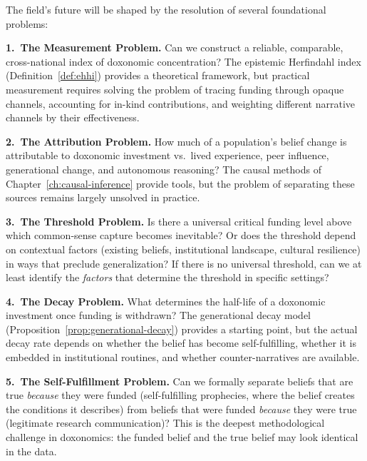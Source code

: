 The field's future will be shaped by the resolution of several foundational problems:

\begin{conjecture}
\label{conj:open}
\leavevmode

\medskip\noindent\textbf{1.\ The Measurement Problem.}
Can we construct a reliable, comparable, cross-national index of doxonomic concentration?
The epistemic Herfindahl index (Definition~\ref{def:ehhi}) provides a theoretical framework, but practical measurement requires solving the problem of tracing funding through opaque channels, accounting for in-kind contributions, and weighting different narrative channels by their effectiveness.

\medskip\noindent\textbf{2.\ The Attribution Problem.}
How much of a population's belief change is attributable to doxonomic investment vs.\ lived experience, peer influence, generational change, and autonomous reasoning?
The causal methods of Chapter~\ref{ch:causal-inference} provide tools, but the problem of separating these sources remains largely unsolved in practice.

\medskip\noindent\textbf{3.\ The Threshold Problem.}
Is there a universal critical funding level above which common-sense capture becomes inevitable?
Or does the threshold depend on contextual factors (existing beliefs, institutional landscape, cultural resilience) in ways that preclude generalization?
If there is no universal threshold, can we at least identify the \emph{factors} that determine the threshold in specific settings?

\medskip\noindent\textbf{4.\ The Decay Problem.}
What determines the half-life of a doxonomic investment once funding is withdrawn?
The generational decay model (Proposition~\ref{prop:generational-decay}) provides a starting point, but the actual decay rate depends on whether the belief has become self-fulfilling, whether it is embedded in institutional routines, and whether counter-narratives are available.

\medskip\noindent\textbf{5.\ The Self-Fulfillment Problem.}
Can we formally separate beliefs that are true \emph{because} they were funded (self-fulfilling prophecies, where the belief creates the conditions it describes) from beliefs that were funded \emph{because} they were true (legitimate research communication)?
This is the deepest methodological challenge in doxonomics: the funded belief and the true belief may look identical in the data.


\end{conjecture}
